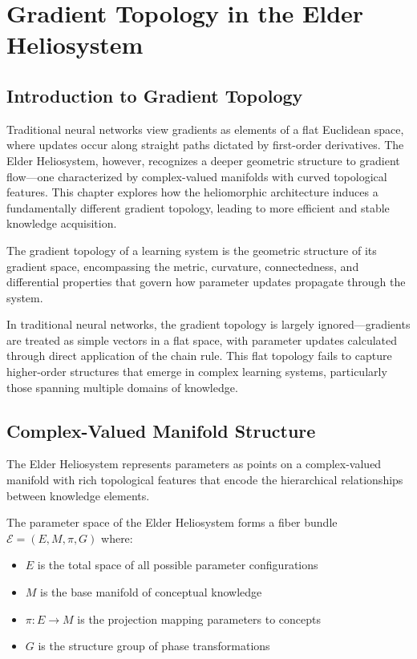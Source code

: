 \chapter{Gradient Topology in the Elder Heliosystem}

\section{Introduction to Gradient Topology}

Traditional neural networks view gradients as elements of a flat Euclidean space, where updates occur along straight paths dictated by first-order derivatives. The Elder Heliosystem, however, recognizes a deeper geometric structure to gradient flow—one characterized by complex-valued manifolds with curved topological features. This chapter explores how the heliomorphic architecture induces a fundamentally different gradient topology, leading to more efficient and stable knowledge acquisition.

\begin{definition}
The gradient topology of a learning system is the geometric structure of its gradient space, encompassing the metric, curvature, connectedness, and differential properties that govern how parameter updates propagate through the system.
\end{definition}

In traditional neural networks, the gradient topology is largely ignored—gradients are treated as simple vectors in a flat space, with parameter updates calculated through direct application of the chain rule. This flat topology fails to capture higher-order structures that emerge in complex learning systems, particularly those spanning multiple domains of knowledge.

\section{Complex-Valued Manifold Structure}

The Elder Heliosystem represents parameters as points on a complex-valued manifold with rich topological features that encode the hierarchical relationships between knowledge elements.

\begin{theorem}
The parameter space of the Elder Heliosystem forms a fiber bundle $\mathcal{E} = (E, M, \pi, G)$ where:
\begin{itemize}
    \item $E$ is the total space of all possible parameter configurations
    \item $M$ is the base manifold of conceptual knowledge
    \item $\pi: E \rightarrow M$ is the projection mapping parameters to concepts
    \item $G$ is the structure group of phase transformations
\end{itemize}
\end{theorem}

